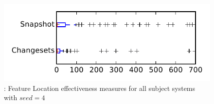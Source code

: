 
\begin{figure}
\centering
\includegraphics[height=0.4\textheight]{figures/flt_seed/rq1_tiny_4}
\caption{\rone: Feature Location effectiveness measures for all subject systems with $seed=4$}
\label{fig:flt_seed:rq1:tiny}
\end{figure}
